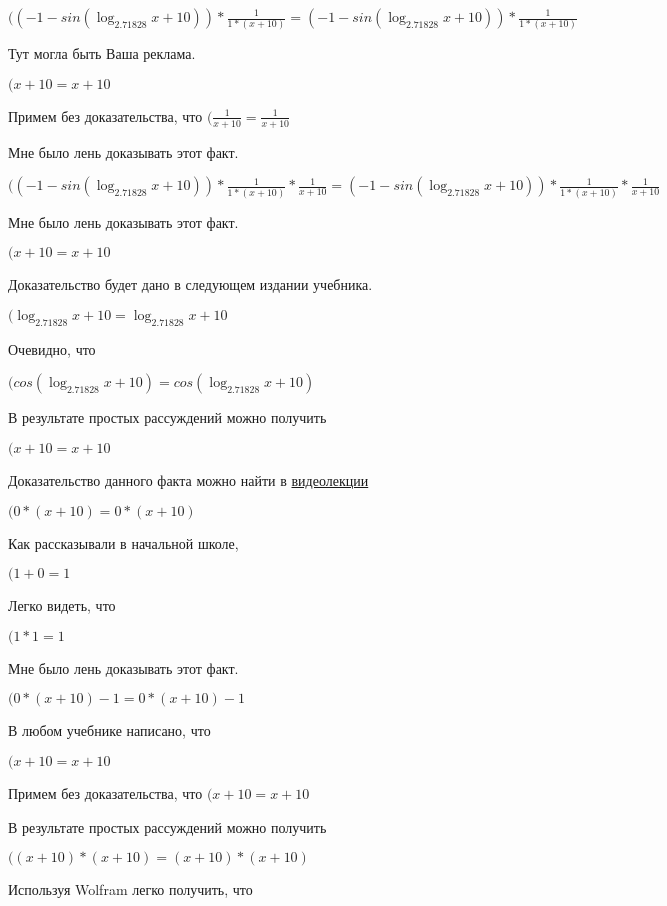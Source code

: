 \documentclass[12pt,a4paper,fleqn]{article}
\theoremstyle{definition}
\begin{document}
$(( -1  - sin(\log_{ 2.71828 }{ x  +  10 })) * \frac{ 1 }{ 1  * ( x  +  10 )}
 = ( -1  - sin(\log_{ 2.71828 }{ x  +  10 })) * \frac{ 1 }{ 1  * ( x  +  10 )}
$

Тут могла быть Ваша реклама.

$( x  +  10  =  x  +  10 $

Примем без доказательства, что
$(\frac{ 1 }{ x  +  10 }
 = \frac{ 1 }{ x  +  10 }
$

Мне было лень доказывать этот факт.

$(( -1  - sin(\log_{ 2.71828 }{ x  +  10 })) * \frac{ 1 }{ 1  * ( x  +  10 )}
 * \frac{ 1 }{ x  +  10 }
 = ( -1  - sin(\log_{ 2.71828 }{ x  +  10 })) * \frac{ 1 }{ 1  * ( x  +  10 )}
 * \frac{ 1 }{ x  +  10 }
$

Мне было лень доказывать этот факт.

$( x  +  10  =  x  +  10 $

Доказательство будет дано в следующем издании учебника.

$(\log_{ 2.71828 }{ x  +  10 } = \log_{ 2.71828 }{ x  +  10 }$

Очевидно, что

$(cos(\log_{ 2.71828 }{ x  +  10 }) = cos(\log_{ 2.71828 }{ x  +  10 })$

В результате простых рассуждений можно получить

$( x  +  10  =  x  +  10 $

Доказательство данного факта можно найти в \href{https://www.youtube.com/watch?v=dQw4w9WgXcQ}{видеолекции}

$( 0  * ( x  +  10 ) =  0  * ( x  +  10 )$

Как рассказывали в начальной школе,

$( 1  +  0  =  1 $

Легко видеть, что

$( 1  *  1  =  1 $

Мне было лень доказывать этот факт.

$( 0  * ( x  +  10 ) -  1  =  0  * ( x  +  10 ) -  1 $

В любом учебнике написано, что

$( x  +  10  =  x  +  10 $

Примем без доказательства, что
$( x  +  10  =  x  +  10 $

В результате простых рассуждений можно получить

$(( x  +  10 ) * ( x  +  10 ) = ( x  +  10 ) * ( x  +  10 )$

Используя Wolfram легко получить, что
\end{document}
